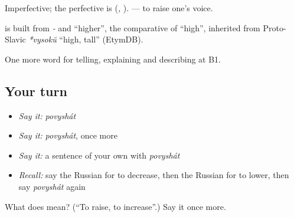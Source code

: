 Imperfective; the perfective is \emph{} (\emph{, }). \emph{ } — to raise one’s voice.

\begin{cousinweb}
\textbf{} is built from \emph{-} and \emph{} \textquotedblleft{}higher\textquotedblright{}, the comparative of \emph{} \textquotedblleft{}high\textquotedblright{}, inherited from Proto-Slavic \emph{*vysokŭ} \textquotedblleft{}high, tall\textquotedblright{} (EtymDB).
\end{cousinweb}

\begin{grammarlens}[title={What you've built}]
One more word for telling, explaining and describing at B1.
\end{grammarlens}

\subsection*{Your turn}
\begin{itemize}
\raggedright
  \item \emph{Say it:} \emph{povyshát}
  \item \emph{Say it:} \emph{povyshát}, once more
  \item \emph{Say it:} a sentence of your own with \emph{povyshát}
  \item \emph{Recall:} say the Russian for to decrease, then the Russian for to lower, then say \emph{povyshát} again
\end{itemize}

\begin{tcolorbox}[breakable,colback=teal!4,colframe=teal!35!black,title={Before you move on}]
What does  mean? (\textquotedblleft{}To raise, to increase\textquotedblright{}.) Say it once more.
\end{tcolorbox}
